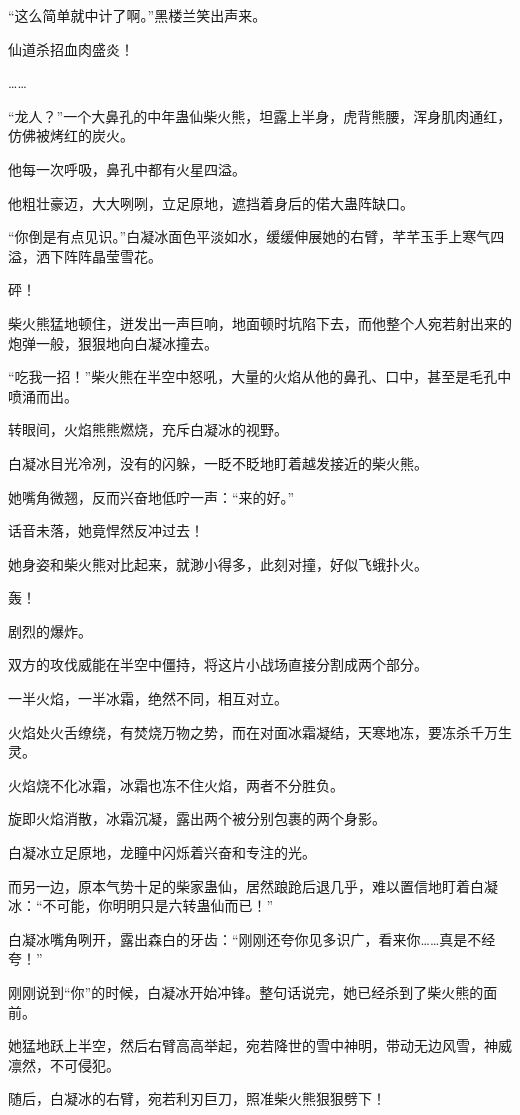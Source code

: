 \begin{this_body}
“这么简单就中计了啊。”黑楼兰笑出声来。

仙道杀招血肉盛炎！

……

“龙人？”一个大鼻孔的中年蛊仙柴火熊，坦露上半身，虎背熊腰，浑身肌肉通红，仿佛被烤红的炭火。

他每一次呼吸，鼻孔中都有火星四溢。

他粗壮豪迈，大大咧咧，立足原地，遮挡着身后的偌大蛊阵缺口。

“你倒是有点见识。”白凝冰面色平淡如水，缓缓伸展她的右臂，芊芊玉手上寒气四溢，洒下阵阵晶莹雪花。

砰！

柴火熊猛地顿住，迸发出一声巨响，地面顿时坑陷下去，而他整个人宛若射出来的炮弹一般，狠狠地向白凝冰撞去。

“吃我一招！”柴火熊在半空中怒吼，大量的火焰从他的鼻孔、口中，甚至是毛孔中喷涌而出。

转眼间，火焰熊熊燃烧，充斥白凝冰的视野。

白凝冰目光冷冽，没有的闪躲，一眨不眨地盯着越发接近的柴火熊。

她嘴角微翘，反而兴奋地低咛一声：“来的好。”

话音未落，她竟悍然反冲过去！

她身姿和柴火熊对比起来，就渺小得多，此刻对撞，好似飞蛾扑火。

轰！

剧烈的爆炸。

双方的攻伐威能在半空中僵持，将这片小战场直接分割成两个部分。

一半火焰，一半冰霜，绝然不同，相互对立。

火焰处火舌缭绕，有焚烧万物之势，而在对面冰霜凝结，天寒地冻，要冻杀千万生灵。

火焰烧不化冰霜，冰霜也冻不住火焰，两者不分胜负。

旋即火焰消散，冰霜沉凝，露出两个被分别包裹的两个身影。

白凝冰立足原地，龙瞳中闪烁着兴奋和专注的光。

而另一边，原本气势十足的柴家蛊仙，居然踉跄后退几乎，难以置信地盯着白凝冰：“不可能，你明明只是六转蛊仙而已！”

白凝冰嘴角咧开，露出森白的牙齿：“刚刚还夸你见多识广，看来你……真是不经夸！”

刚刚说到“你”的时候，白凝冰开始冲锋。整句话说完，她已经杀到了柴火熊的面前。

她猛地跃上半空，然后右臂高高举起，宛若降世的雪中神明，带动无边风雪，神威凛然，不可侵犯。

随后，白凝冰的右臂，宛若利刃巨刀，照准柴火熊狠狠劈下！


\end{this_body}
